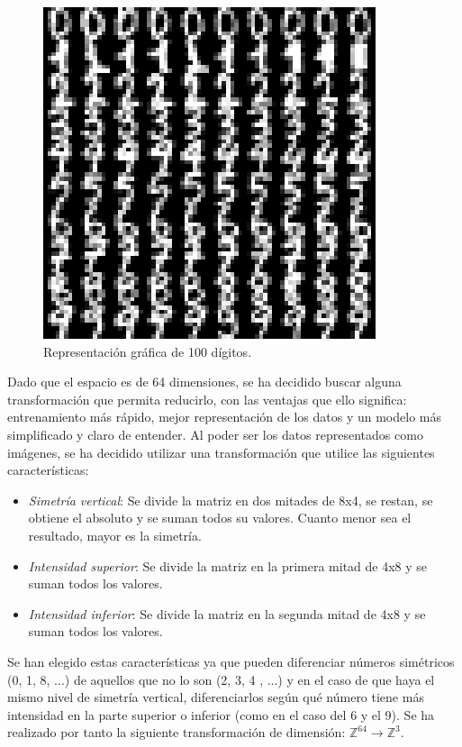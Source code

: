 \documentclass[12pt,spanish]{article} %
\begin{document}
\begin{figure}[H]
  \begin{center}
  \includegraphics[scale=0.8]{digitos}
  \caption{Representación gráfica de 100 dígitos.}
  \label{fig:digitos}
  \end{center}
\end{figure}

Dado que el espacio es de 64 dimensiones, se ha decidido buscar alguna transformación que permita reducirlo, con las ventajas que ello significa: entrenamiento más rápido, mejor representación de los datos y un modelo más simplificado y claro de entender. Al poder ser los datos representados como imágenes, se ha decidido utilizar una transformación que utilice las siguientes características:

\begin{itemize}
\item \textit{Simetría vertical}: Se divide la matriz en dos mitades de 8x4, se restan, se obtiene el absoluto y se suman todos su valores. Cuanto menor sea el resultado, mayor es la simetría.
\item \textit{Intensidad superior}: Se divide la matriz en la primera mitad de 4x8 y se suman todos los valores.
\item \textit{Intensidad inferior}: Se divide la matriz en la segunda mitad de 4x8 y se suman todos los valores.
\end{itemize}

Se han elegido estas características ya que pueden diferenciar números simétricos (0, 1, 8, ...) de aquellos que no lo son (2, 3, 4 , ...) y en el caso de que haya el mismo nivel de simetría vertical, diferenciarlos según qué número tiene más intensidad en la parte superior o inferior (como en el caso del 6 y el 9). Se ha realizado por tanto la siguiente transformación de dimensión: $\mathbb{Z}^{64} \rightarrow \mathbb{Z}^3$.
\end{document}
